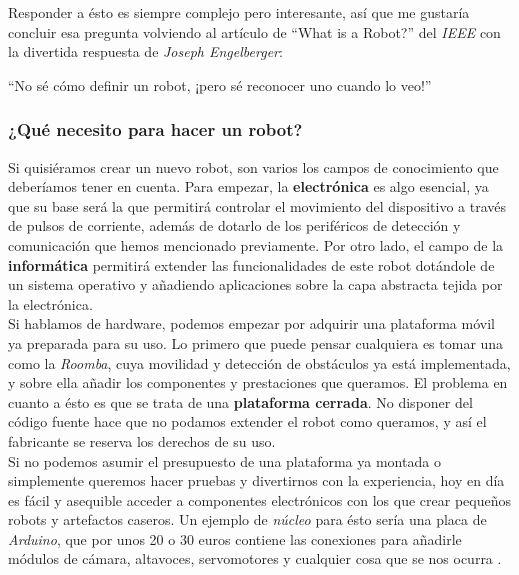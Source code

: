 Responder a ésto es siempre complejo pero interesante, así que me gustaría concluir esa pregunta volviendo al artículo de ``What is a Robot?'' del \textit{IEEE} \cite{whats_a_robot} con la divertida respuesta de \textit{Joseph Engelberger}:

\begin{displayquote}
	``No sé cómo definir un robot, ¡pero sé reconocer uno cuando lo veo!''
\end{displayquote}

\subsubsection{¿Qué necesito para hacer un robot?}

Si quisiéramos crear un nuevo robot, son varios los campos de conocimiento que deberíamos tener en cuenta. Para empezar, la \textbf{electrónica} es algo esencial, ya que su base será la que permitirá controlar el movimiento del dispositivo a través de pulsos de corriente, además de dotarlo de los periféricos de detección y comunicación que hemos mencionado previamente. Por otro lado, el campo de la \textbf{informática} permitirá extender las funcionalidades de este robot dotándole de un sistema operativo y añadiendo aplicaciones sobre la capa abstracta tejida por la electrónica.\\

Si hablamos de hardware, podemos empezar por adquirir una plataforma móvil ya preparada para su uso. Lo primero que puede pensar cualquiera es tomar una como la \textit{Roomba}, cuya movilidad y detección de obstáculos ya está implementada, y sobre ella añadir los componentes y prestaciones que queramos. El problema en cuanto a ésto es que se trata de una \textbf{plataforma cerrada}. No disponer del código fuente hace que no podamos extender el robot como queramos, y así el fabricante se reserva los derechos de su uso.\\

Si no podemos asumir el presupuesto de una plataforma ya montada o simplemente queremos hacer pruebas y divertirnos con la experiencia, hoy en día es fácil y asequible acceder a componentes electrónicos con los que crear pequeños robots y artefactos caseros. Un ejemplo de \textit{núcleo} para ésto sería una placa de \textit{Arduino}, que por unos 20 o 30 euros contiene las conexiones para añadirle módulos de cámara, altavoces, servomotores y cualquier cosa que se nos ocurra \cite{arduino-store}.\\

